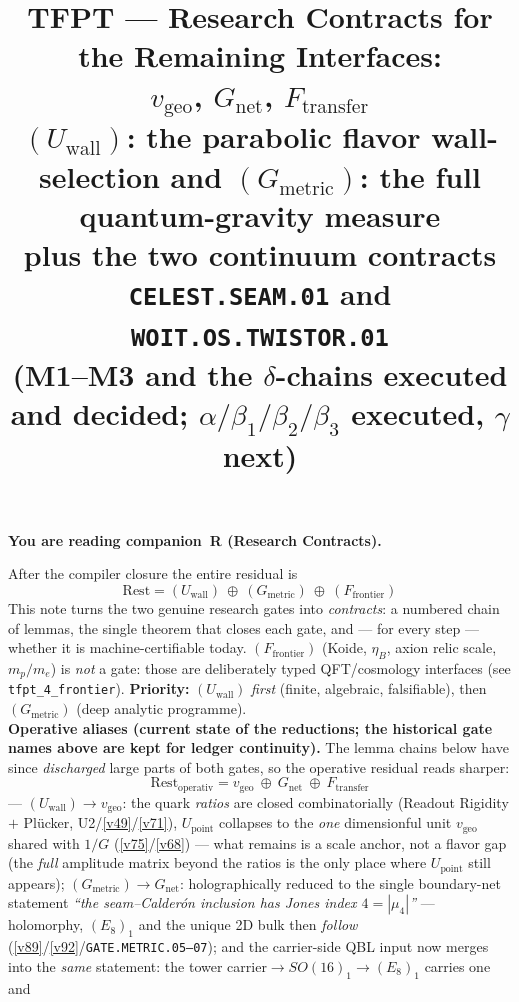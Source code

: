\documentclass[11pt,a4paper]{article}
\title{\vspace{-1.2cm}\textbf{TFPT --- Research Contracts for the Remaining Interfaces:\\$v_{\mathrm{geo}}$, $G_{\mathrm{net}}$, $F_{\mathrm{transfer}}$}\\[2mm]
\large $(U_{\mathrm{wall}})$: the parabolic flavor wall-selection \quad and\quad
$(G_{\mathrm{metric}})$: the full quantum-gravity measure\\[1mm]
\large plus the two continuum contracts \texttt{CELEST.SEAM.01} and \texttt{WOIT.OS.TWISTOR.01}\\
(M1--M3 and the $\delta$-chains executed and decided; $\alpha/\beta_1/\beta_2/\beta_3$ executed, $\gamma$ next)}
\author{\TFPTauthors}\date{\TFPTdatestamp}
\begin{document}
\maketitle


\noindent\textbf{You are reading \textbf{companion~R} (Research Contracts).}


\TFPTbadges
\TFPTclaimstack[bridges]

\vspace{-0.6cm}

\begin{keybox}
After the compiler closure the entire residual is
\[
  \boxed{\ \text{Rest}=(U_{\mathrm{wall}})\ \oplus\ (G_{\mathrm{metric}})\ \oplus\ (F_{\mathrm{frontier}})\ }
\]
This note turns the two genuine research gates into \emph{contracts}: a numbered chain of lemmas, the
single theorem that closes each gate, and --- for every step --- whether it is machine-certifiable today.
$(F_{\mathrm{frontier}})$ (Koide, $\eta_B$, axion relic scale, $m_p/m_e$) is \emph{not} a gate: those are
deliberately typed QFT/cosmology interfaces (see \texttt{tfpt\_4\_frontier}). \textbf{Priority:}
$(U_{\mathrm{wall}})$ \emph{first} (finite, algebraic, falsifiable), then $(G_{\mathrm{metric}})$ (deep
analytic programme).
\smallskip\\
\noindent\textbf{Operative aliases (current state of the reductions; the historical gate names above are
kept for ledger continuity).} The lemma chains below have since \emph{discharged} large parts of both
gates, so the operative residual reads sharper:
\[
  \boxed{\ \text{Rest}_{\mathrm{operativ}}=v_{\mathrm{geo}}\ \oplus\ G_{\mathrm{net}}\ \oplus\ F_{\mathrm{transfer}}\ }
\]
--- $(U_{\mathrm{wall}})\to v_{\mathrm{geo}}$: the quark \emph{ratios} are closed combinatorially (Readout
Rigidity $+$ Pl\"ucker, U2/\vref{v49}/\vref{v71}), $U_{\mathrm{point}}$ collapses to the \emph{one} dimensionful unit
$v_{\mathrm{geo}}$ shared with $1/G$ (\vref{v75}/\vref{v68}) --- what remains is a scale anchor, not a flavor gap (the
\emph{full} amplitude matrix beyond the ratios is the only place where $U_{\mathrm{point}}$ still appears);
$(G_{\mathrm{metric}})\to G_{\mathrm{net}}$: holographically reduced to the single boundary-net statement
\emph{``the seam--Calder\'on inclusion has Jones index $4=|\mu_4|$''} --- holomorphy, $(E_8)_1$ and the
unique 2D bulk then \emph{follow} (\vref{v89}/\vref{v92}/\texttt{GATE.METRIC.05--07}); and the carrier-side QBL input
now merges into the \emph{same} statement: the tower carrier${}\to SO(16)_1\to(E_8)_1$ carries one and

\end{keybox}
\end{document}
